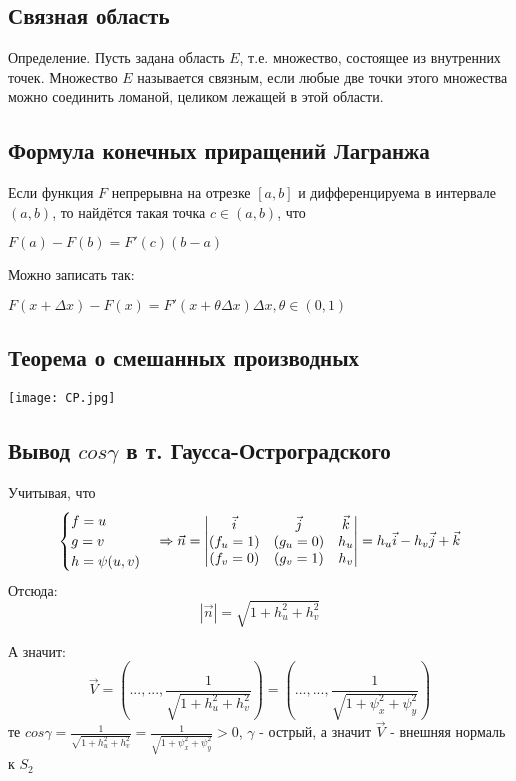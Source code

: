 \documentclass[12pt]{article}
\begin{document}
\subsection{Связная область}\label{eq4}
Определение. Пусть задана область $E$, т.е. множество, состоящее из внутренних точек. Множество $E$ называется связным, если любые две точки этого
множества можно соединить ломаной, целиком лежащей в этой области.

\subsection{Формула конечных приращений Лагранжа}\label{eq5}	
Если функция $F$ непрерывна на отрезке $[a,b]$  и дифференцируема в интервале $(a,b)$, то найдётся такая точка $ c\in (a,b)$, что
 
	$F(a) - F(b) = F'(c)(b - a)$
	
	Можно записать так:
	
	$F(x + \Delta x) - F(x) = F'(x + \theta\Delta x)\Delta x , \theta \in (0,1) $

\subsection{Теорема о смешанных производных}\label{eq6}
\texttt{[image: CP.jpg]}	

\subsection{Вывод $cos\gamma$ в т. Гаусса-Остроградского}\label{eq10}
Учитывая, что 
$$
\begin{cases}
   f = u \\
   g = v \\
   h = \psi(u,v)
\end{cases}
\Rightarrow
\vec{n} = 
\begin{vmatrix}
\vec{i} & \vec{j} & \vec{k} \\
(f_u = 1) & (g_u = 0) & h_u \\
(f_v = 0) & (g_v = 1) & h_v 
\end{vmatrix}
=
\-h_u \vec{i} - h_v \vec{j} + \vec{k}
$$
Отсюда:
$$
|\vec{n}| = \sqrt{1+h_u^2 + h_v^2}
$$

А значит:
$$
\vec{V} = ( ..., ... , \frac{1}{\sqrt{1+h_u^2 + h_v^2}})
=
( ..., ... , \frac{1}{\sqrt{1+\psi_x^2 + \psi_y^2}})
$$
те $cos\gamma = \frac{1}{\sqrt{1+h_u^2 + h_v^2}} = \frac{1}{\sqrt{1+\psi_x^2 + \psi_y^2}}> 0$, $\gamma$ - острый, а значит $\vec{V}$ - внешняя нормаль к $S_2$
\end{document}
